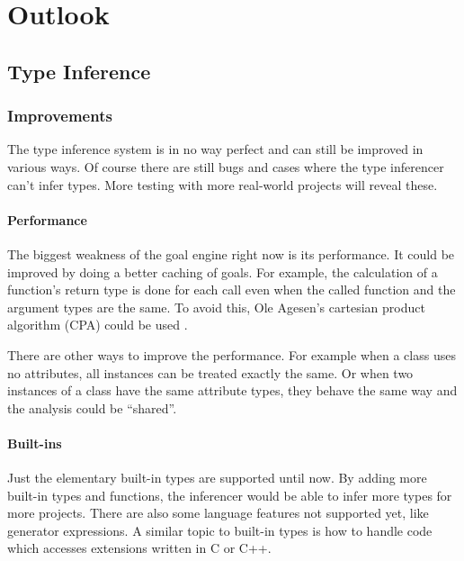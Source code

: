 \documentclass[12pt,halfparskip,DIV11,BCOR10mm]{scrreprt}
\begin{document}
\chapter{Outlook}


\section{Type Inference}
\label{outlook_type_inference}

\subsection{Improvements}

The type inference system is in no way perfect and can still be improved in various ways. Of course there are still bugs and cases where the type inferencer can't infer types. More testing with more real-world projects will reveal these.

\subsubsection{Performance}

The biggest weakness of the goal engine right now is its performance. It could be improved by doing a better caching of goals. For example, the calculation of a function's return type is done for each call even when the called function and the argument types are the same. To avoid this, Ole Agesen's cartesian product algorithm (CPA) could be used \cite{cpa}.

There are other ways to improve the performance. For example when a class uses no attributes, all instances can be treated exactly the same. Or when two instances of a class have the same attribute types, they behave the same way and the analysis could be ``shared''.

\subsubsection{Built-ins}

Just the elementary built-in types are supported until now. By adding more built-in types and functions, the inferencer would be able to infer more types for more projects. There are also some language features not supported yet, like generator expressions. A similar topic to built-in types is how to handle code which accesses extensions written in C or C++.
\end{document}
